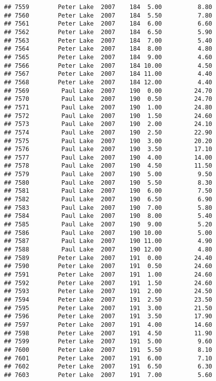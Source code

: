 \documentclass[
]{article}
\begin{document}
\begin{verbatim}
## 7559        Peter Lake  2007    184  5.00          8.80
## 7560        Peter Lake  2007    184  5.50          7.80
## 7561        Peter Lake  2007    184  6.00          6.60
## 7562        Peter Lake  2007    184  6.50          5.90
## 7563        Peter Lake  2007    184  7.00          5.40
## 7564        Peter Lake  2007    184  8.00          4.80
## 7565        Peter Lake  2007    184  9.00          4.60
## 7566        Peter Lake  2007    184 10.00          4.50
## 7567        Peter Lake  2007    184 11.00          4.40
## 7568        Peter Lake  2007    184 12.00          4.40
## 7569         Paul Lake  2007    190  0.00         24.70
## 7570         Paul Lake  2007    190  0.50         24.70
## 7571         Paul Lake  2007    190  1.00         24.80
## 7572         Paul Lake  2007    190  1.50         24.60
## 7573         Paul Lake  2007    190  2.00         24.10
## 7574         Paul Lake  2007    190  2.50         22.90
## 7575         Paul Lake  2007    190  3.00         20.20
## 7576         Paul Lake  2007    190  3.50         17.10
## 7577         Paul Lake  2007    190  4.00         14.00
## 7578         Paul Lake  2007    190  4.50         11.50
## 7579         Paul Lake  2007    190  5.00          9.50
## 7580         Paul Lake  2007    190  5.50          8.30
## 7581         Paul Lake  2007    190  6.00          7.50
## 7582         Paul Lake  2007    190  6.50          6.90
## 7583         Paul Lake  2007    190  7.00          5.80
## 7584         Paul Lake  2007    190  8.00          5.40
## 7585         Paul Lake  2007    190  9.00          5.20
## 7586         Paul Lake  2007    190 10.00          5.00
## 7587         Paul Lake  2007    190 11.00          4.90
## 7588         Paul Lake  2007    190 12.00          4.80
## 7589        Peter Lake  2007    191  0.00         24.40
## 7590        Peter Lake  2007    191  0.50         24.60
## 7591        Peter Lake  2007    191  1.00         24.60
## 7592        Peter Lake  2007    191  1.50         24.60
## 7593        Peter Lake  2007    191  2.00         24.50
## 7594        Peter Lake  2007    191  2.50         23.50
## 7595        Peter Lake  2007    191  3.00         21.50
## 7596        Peter Lake  2007    191  3.50         17.90
## 7597        Peter Lake  2007    191  4.00         14.60
## 7598        Peter Lake  2007    191  4.50         11.90
## 7599        Peter Lake  2007    191  5.00          9.60
## 7600        Peter Lake  2007    191  5.50          8.10
## 7601        Peter Lake  2007    191  6.00          7.10
## 7602        Peter Lake  2007    191  6.50          6.30
## 7603        Peter Lake  2007    191  7.00          5.60

\end{verbatim}
\end{document}
